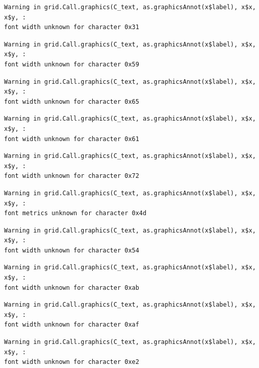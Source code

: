 \documentclass[
  letterpaper,
  DIV=11,
  numbers=noendperiod]{scrreprt}
\begin{document}
\begin{verbatim}
Warning in grid.Call.graphics(C_text, as.graphicsAnnot(x$label), x$x, x$y, :
font width unknown for character 0x31
\end{verbatim}

\begin{verbatim}
Warning in grid.Call.graphics(C_text, as.graphicsAnnot(x$label), x$x, x$y, :
font width unknown for character 0x59
\end{verbatim}

\begin{verbatim}
Warning in grid.Call.graphics(C_text, as.graphicsAnnot(x$label), x$x, x$y, :
font width unknown for character 0x65
\end{verbatim}

\begin{verbatim}
Warning in grid.Call.graphics(C_text, as.graphicsAnnot(x$label), x$x, x$y, :
font width unknown for character 0x61
\end{verbatim}

\begin{verbatim}
Warning in grid.Call.graphics(C_text, as.graphicsAnnot(x$label), x$x, x$y, :
font width unknown for character 0x72
\end{verbatim}

\begin{verbatim}
Warning in grid.Call.graphics(C_text, as.graphicsAnnot(x$label), x$x, x$y, :
font metrics unknown for character 0x4d
\end{verbatim}

\begin{verbatim}
Warning in grid.Call.graphics(C_text, as.graphicsAnnot(x$label), x$x, x$y, :
font width unknown for character 0x54
\end{verbatim}

\begin{verbatim}
Warning in grid.Call.graphics(C_text, as.graphicsAnnot(x$label), x$x, x$y, :
font width unknown for character 0xab
\end{verbatim}

\begin{verbatim}
Warning in grid.Call.graphics(C_text, as.graphicsAnnot(x$label), x$x, x$y, :
font width unknown for character 0xaf
\end{verbatim}

\begin{verbatim}
Warning in grid.Call.graphics(C_text, as.graphicsAnnot(x$label), x$x, x$y, :
font width unknown for character 0xe2
\end{verbatim}
\end{document}
